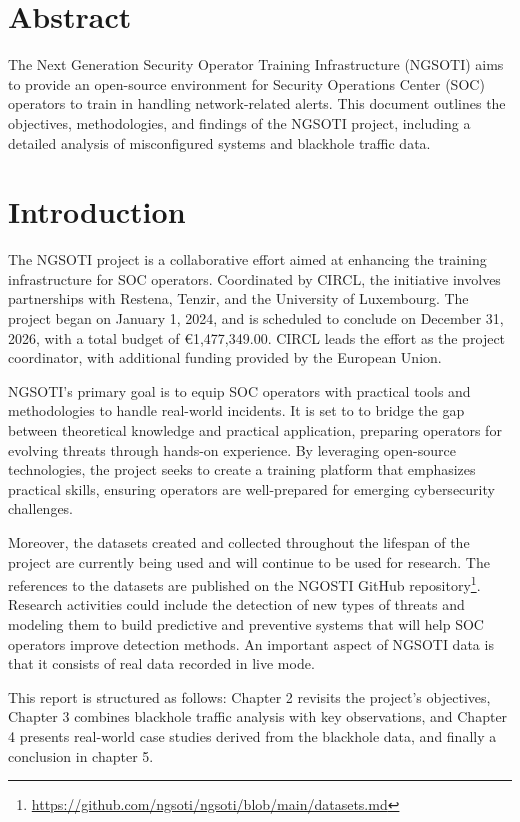 \chapter*{Abstract}
The Next Generation Security Operator Training Infrastructure (NGSOTI) aims to provide an open-source environment for Security Operations Center (SOC) operators to train in handling network-related alerts. This document outlines the objectives, methodologies, and findings of the NGSOTI project, including a detailed analysis of misconfigured systems and blackhole traffic data.

\tableofcontents

\chapter{Introduction}
The NGSOTI project is a collaborative effort aimed at enhancing the training infrastructure for SOC operators. Coordinated by CIRCL, the initiative involves partnerships with Restena, Tenzir, and the University of Luxembourg. The project began on January 1, 2024, and is scheduled to conclude on December 31, 2026, with a total budget of €1,477,349.00. CIRCL leads the effort as the project coordinator, with additional funding provided by the European Union.

NGSOTI's primary goal is to equip SOC operators with practical tools and methodologies to handle real-world incidents. It is set to to bridge the gap between theoretical knowledge and practical application, preparing operators for evolving threats through hands-on experience. By leveraging open-source technologies, the project seeks to create a training platform that emphasizes practical skills, ensuring operators are well-prepared for emerging cybersecurity challenges.

Moreover, the datasets created and collected throughout the lifespan of the project are currently being used and will continue to be used for research. The references to the datasets are published on the NGOSTI GitHub repository\footnote{\url{https://github.com/ngsoti/ngsoti/blob/main/datasets.md}}. Research activities could include the detection of new types of threats and modeling them to build predictive and preventive systems that will help SOC operators improve detection methods. An important aspect of NGSOTI data is that it consists of real data recorded in live mode.

This report is structured as follows: Chapter 2 revisits the project's objectives, Chapter 3 combines blackhole traffic analysis with key observations, and Chapter 4 presents real-world case studies derived from the blackhole data, and finally a conclusion in chapter 5.


